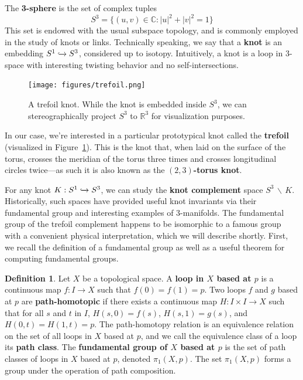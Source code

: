 \documentclass[12pt,twoside]{reedthesis}
\theoremstyle{definition}
\newtheorem{defn}[thm]{Definition}
\newcommand{\R}{\mathbb{R}}
\newcommand{\C}{\mathbb{C}}
\newcommand{\into}{\xhookrightarrow{}}
\newcommand{\wo}{\, \backslash \,}
\newcommand{\defnphrase}[1]{\textbf{#1}}
\begin{document}
The \defnphrase{3-sphere} is the set of complex tuples
\begin{equation*}
  S^3 = \{ (u, v) \in \C : |u|^2 + |v|^2 = 1 \}
\end{equation*}
This set is endowed with the usual subspace topology, and is commonly employed in the study of knots or links.
Technically speaking, we say that a \defnphrase{knot} is an embedding $S^1 \into S^3$, considered up to isotopy.
Intuitively, a knot is a loop in 3-space with interesting twisting behavior and no self-intersections.

\begin{figure}[h]
  \centering
  \texttt{[image: figures/trefoil.png]}
  \caption{A trefoil knot. While the knot is embedded inside $S^3$, we can stereographically project $S^3$ to $\R^3$ for visualization purposes.}
  \label{fig:trefoil}
\end{figure}

In our case, we're interested in a particular prototypical knot called the \defnphrase{trefoil} (visualized in Figure~\ref{fig:trefoil}).
This is the knot that, when laid on the surface of the torus, crosses the meridian of the torus three times and crosses longitudinal circles twice---as such it is also known as the \defnphrase{$(2, 3)$-torus knot}.

For any knot $K : S^1 \into S^3$, we can study the \defnphrase{knot complement} space $S^3 \wo K$.
Historically, such spaces have provided useful knot invariants via their fundamental group and interesting examples of 3-manifolds.
The fundamental group of the trefoil complement happens to be isomorphic to a famous group with a convenient physical interpretation, which we will describe shortly.
First, we recall the definition of a fundamental group as well as a useful theorem for computing fundamental groups.

\begin{defn}
  Let $X$ be a topological space. A \defnphrase{loop in $X$ based at $p$} is a continuous map $f : I \to X$ such that $f(0) = f(1) = p$.
  Two loops $f$ and $g$ based at $p$ are \defnphrase{path-homotopic} if there exists a continuous map $H : I \times I \to X$ such that for all $s$ and $t$ in $I$, $H(s, 0) = f(s)$,  $H(s, 1) = g(s)$, and $H(0, t) = H(1, t) = p$.
  The path-homotopy relation is an equivalence relation on the set of all loops in $X$ based at $p$, and we call the equivalence class of a loop its \defnphrase{path class}.
  The \defnphrase{fundamental group of $X$ based at $p$} is the set of path classes of loops in $X$ based at $p$, denoted $\pi_1(X, p)$.
  The set $\pi_1(X, p)$ forms a group under the operation of path composition.
\end{defn}
\end{document}
